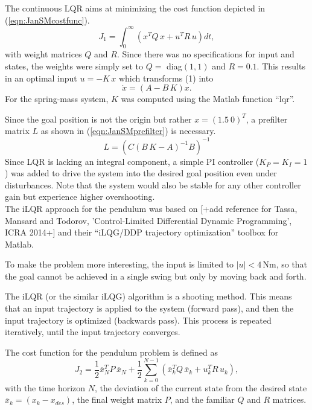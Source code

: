 \documentclass[letterpaper, 10 pt, conference]{ieeeconf}  %
\begin{document}
The continuous LQR aims at minimizing the cost function depicted in (\ref{eqn:JanSMcostfunc}).
\begin{equation}\label{eqn:JanSMcostfunc}
	J_1 = \int^{\infty}_{0} \left(x^{T}Q\,x + u^{T}R\,u\right)dt,
\end{equation}
with weight matrices $Q$ and $R$.
Since there was no specifications for input and states, the weights were simply set to $Q=$ diag$(1,1)$ and $R=0.1$. 
This results in an optimal input $u=-K\,x$ which transforms (1) into
\begin{equation}\label{eqn:JanSMcontrolledSys}
	\dot{x} = (A-B\,K)x.
\end{equation}
For the spring-mass system, $K$ was computed using the Matlab function ``lqr''.

Since the goal position is not the origin but rather $x=(1.5 ~ 0)^T$, a prefilter matrix $L$ as shown in (\ref{eqn:JanSMprefilter}) is necessary.
\begin{equation}\label{eqn:JanSMprefilter}
L = \left(C(B\,K-A)^{-1}B\right)^{-1}
\end{equation}
Since LQR is lacking an integral component, a simple PI controller ($K_P=K_I=1$) was added to drive the system into the desired goal position even under disturbances. Note that the system would also be stable for any other controller gain but experience higher overshooting.\\

The iLQR approach for the pendulum was based on [+add reference for Tassa, Mansard and Todorov, 'Control-Limited Differential Dynamic Programming', ICRA 2014+] and their ``iLQG/DDP trajectory optimization'' toolbox for Matlab. 

 To make the problem more interesting, the input is limited to $|u|<4$\,Nm, so that the goal cannot be achieved in a single swing but only by moving back and forth. 

The iLQR (or the similar iLQG) algorithm is a shooting method. This means that an input trajectory is applied to the system (forward pass), and then the input trajectory is optimized (backwards pass). This process is repeated iteratively, until the input trajectory converges.

The cost function for the pendulum problem is defined as 
\begin{equation}\label{eqn:JanPcostfunc}
J_2 = \frac{1}{2}\overline{x}_N^{T}P\,\overline{x}_N + \frac{1}{2}\sum_{k=0}^{N-1}\left(\overline{x}_k^{T}Q\,\overline{x}_k + u_k^{T}R\,u_k\right),
\end{equation}
with the time horizon $N$, the deviation of the current state from the desired state $\overline{x}_k=(x_k-x_{des})$, the final weight matrix $P$, and the familiar $Q$ and $R$ matrices. 
\end{document}
